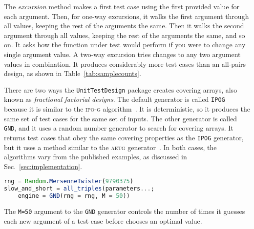 \documentclass{juliacon}
\newcommand{\utd}{\texttt{UnitTestDesign}\xspace}
\begin{document}
\vskip 6pt
The \emph{excursion} method makes a first test case using the first provided value for each argument. Then, for one-way excursions, it walks the first argument through all values, keeping the rest of the arguments the same. Then it walks the second argument through all values, keeping the rest of the arguments the same, and so on. It asks how the function under test would perform if you were to change any single argument value. A two-way excursion tries changes to any two argument values in combination. It produces considerably more test cases than an all-pairs design, as shown in Table~\ref{tab:samplecounts}.

\begin{table}
\end{table}

\vskip 6pt
There are two ways the \utd package creates covering arrays, also known as \emph{fractional factorial designs}. The default generator is called \verb|IPOG| because it is similar to the \textsc{ipo-g} algorithm~\cite{Lei2008-xt}. It is deterministic, so it produces the same set of test cases for the same set of inputs. The other generator is called \verb|GND|, and it uses a random number generator to search for covering arrays. It returns test cases that obey the same covering properties as the \verb|IPOG| generator, but it uses a method similar to the \textsc{aetg} generator~\cite{Cohen1997-lb}. In both cases, the algorithms vary from the published examples, as discussed in Sec.~\ref{sec:implementation}.
\begin{lstlisting}[language=Julia]
rng = Random.MersenneTwister(9790375)
slow_and_short = all_triples(parameters...;
    engine = GND(rng = rng, M = 50))
\end{lstlisting}
The \verb|M=50| argument to the \verb|GND| generator controls the number of times it guesses each new argument of a test case before chooses an optimal value.
\end{document}

